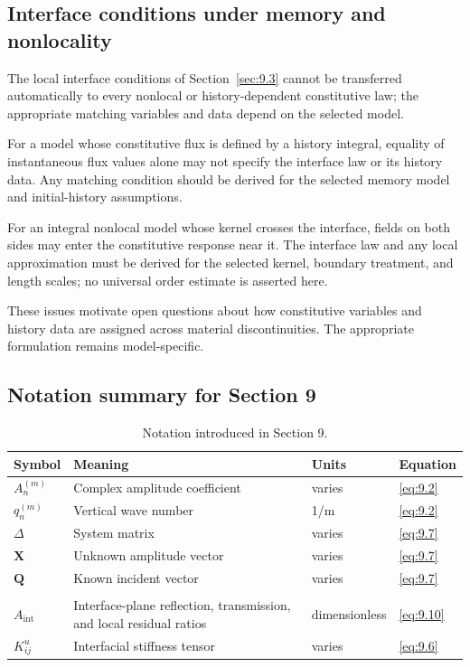 \subsection{Interface conditions under memory and nonlocality}
\label{sec:9.8}

The local interface conditions of Section~\ref{sec:9.3} cannot be transferred automatically to every nonlocal or history-dependent constitutive law; the appropriate matching variables and data depend on the selected model.

For a model whose constitutive flux is defined by a history integral, equality of instantaneous flux values alone may not specify the interface law or its history data. Any matching condition should be derived for the selected memory model and initial-history assumptions.

For an integral nonlocal model whose kernel crosses the interface, fields on both sides may enter the constitutive response near it. The interface law and any local approximation must be derived for the selected kernel, boundary treatment, and length scales; no universal order estimate is asserted here.

These issues motivate open questions about how constitutive variables and history data are assigned across material discontinuities. The appropriate formulation remains model-specific.

\subsection{Notation summary for Section 9}

\begin{table}[htbp]
\centering
\small
\caption{Notation introduced in Section 9.}
\label{tab:notation-sec9}
\begin{tabularx}{\textwidth}{@{}p{1.8cm}X p{2.2cm}p{2.1cm}@{}}
\toprule
\textbf{Symbol} & \textbf{Meaning} & \textbf{Units} & \textbf{Equation} \\
\midrule
$A_n^{(m)}$ & Complex amplitude coefficient & varies & \eqref{eq:9.2} \\
$q_n^{(m)}$ & Vertical wave number & 1/m & \eqref{eq:9.2} \\
$\Delta$ & System matrix & varies & \eqref{eq:9.7} \\
$\bm{X}$ & Unknown amplitude vector & varies & \eqref{eq:9.7} \\
$\bm{Q}$ & Known incident vector & varies & \eqref{eq:9.7} \\
\shortstack{$R_{\Sigma},T_{\Sigma},$\\$A_{\mathrm{int}}$} & Interface-plane reflection, transmission, and local residual ratios & dimensionless & \eqref{eq:9.10} \\
$K_{ij}^u$ & Interfacial stiffness tensor & varies & \eqref{eq:9.6} \\
\bottomrule
\end{tabularx}
\end{table}

